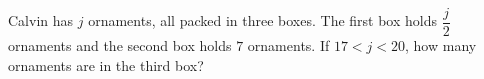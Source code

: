 Calvin has $j$ ornaments, all packed in three boxes. The first box holds $\dfrac{j}{2}$ ornaments and the second box holds $7$ ornaments. If $17<j<20$, how many ornaments are in the third box?

